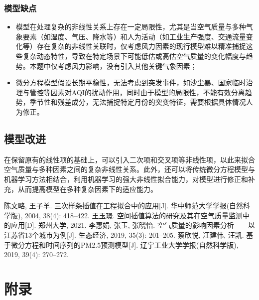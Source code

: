 \documentclass[a4paper,12pt]{article}
\begin{document}
	
	\subsubsection{模型缺点}
	
	\begin{itemize}	
		\item 模型在处理复杂的非线性关系上存在一定局限性，尤其是当空气质量与多种气象要素（如湿度、气压、降水等）和人为活动（如工业生产强度、交通流量变化等）存在复杂的非线性关联时，仅考虑风力因素的现行模型难以精准捕捉这些复杂动态特性，导致在特定场景下可能低估或高估空气质量的变化幅度与趋势。本题中仅考虑风力影响，没有引入其他关键气象因素；
		\item 微分方程模型假设长期平稳性，无法考虑到突发事件，如沙尘暴、国家临时治理与管控等因素对AQI的扰动作用，同时由于模型的局限性，不能有效分离趋势，季节性和残差成分，无法捕捉特定月份的突变特征，需要根据具体情况人为修正。
	\end{itemize}
	
	
	\subsection{模型改进}


在保留原有的线性项的基础上，可以引入二次项和交叉项等非线性项，以此来拟合空气质量与多种因素之间的复杂非线性关系。此外，还可以将传统微分方程模型与机器学习方法相结合，利用机器学习的强大非线性拟合能力，对模型进行修正和补充，从而提高模型在多种复杂因素下的适应能力。

	
	\newpage
	
	\begin{thebibliography}{99}
		 陈文略, 王子羊. 三次样条插值在工程拟合中的应用[J]. 华中师范大学学报(自然科学版), 2004, 38(4): 418–422.
		 王玉璟. 空间插值算法的研究及其在空气质量监测中的应用[D]. 郑州大学, 2021.
		 李惠娟, 张玉, 张晓怡. 空气质量的影响因素分析——以江苏省13个城市为例[J]. 生态经济, 2019, 35(3): 201–205.
		 蔡欣悦, 冮建伟, 汪凯. 基于微分方程和时间序列的PM2.5预测模型[J]. 辽宁工业大学学报(自然科学版), 2019, 39(4): 270–272.

	\end{thebibliography}


	
	\newpage
	
		\section*{附录}
		
\end{document}

